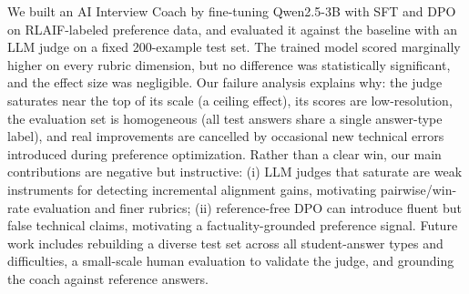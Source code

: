 \documentclass[10pt,twocolumn,letterpaper]{article}
\begin{document}
We built an AI Interview Coach by fine-tuning Qwen2.5-3B with SFT and DPO on RLAIF-labeled preference data, and evaluated it against the baseline with an LLM judge on a fixed 200-example test set. The trained model scored marginally higher on every rubric dimension, but no difference was statistically significant, and the effect size was negligible. Our failure analysis explains why: the judge saturates near the top of its scale (a ceiling effect), its scores are low-resolution, the evaluation set is homogeneous (all test answers share a single answer-type label), and real improvements are cancelled by occasional new technical errors introduced during preference optimization. Rather than a clear win, our main contributions are negative but instructive: (i) LLM judges that saturate are weak instruments for detecting incremental alignment gains, motivating pairwise/win-rate evaluation and finer rubrics; (ii) reference-free DPO can introduce fluent but false technical claims, motivating a factuality-grounded preference signal. Future work includes rebuilding a diverse test set across all student-answer types and difficulties, a small-scale human evaluation to validate the judge, and grounding the coach against reference answers.

{\small


}
\end{document}
